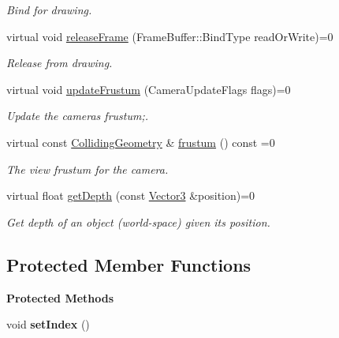\begin{Indent}
\begin{DoxyCompactItemize}
\begin{DoxyCompactList}\small\item\em Bind for drawing. \end{DoxyCompactList}\item 
\mbox{\label{classrev_1_1_abstract_camera_a5e71dd0fd2d2dbf51086f2a29d02aad7}} 
virtual void \mbox{\hyperlink{classrev_1_1_abstract_camera_a5e71dd0fd2d2dbf51086f2a29d02aad7}{release\+Frame}} (Frame\+Buffer\+::\+Bind\+Type read\+Or\+Write)=0
\begin{DoxyCompactList}\small\item\em Release from drawing. \end{DoxyCompactList}\item 
\mbox{\label{classrev_1_1_abstract_camera_a5c9b52f6030262bd0d90e62105798f5e}} 
virtual void \mbox{\hyperlink{classrev_1_1_abstract_camera_a5c9b52f6030262bd0d90e62105798f5e}{update\+Frustum}} (Camera\+Update\+Flags flags)=0
\begin{DoxyCompactList}\small\item\em Update the camera\textquotesingle{}s frustum;. \end{DoxyCompactList}\item 
virtual const \mbox{\hyperlink{classrev_1_1_colliding_geometry}{Colliding\+Geometry}} \& \mbox{\hyperlink{classrev_1_1_abstract_camera_a3bc8bb701690f7e67404a78cfb360708}{frustum}} () const =0
\begin{DoxyCompactList}\small\item\em The view frustum for the camera. \end{DoxyCompactList}\item 
virtual float \mbox{\hyperlink{classrev_1_1_abstract_camera_aad3a00ed805121a7915574b4125a343f}{get\+Depth}} (const \mbox{\hyperlink{classrev_1_1_vector}{Vector3}} \&position)=0
\begin{DoxyCompactList}\small\item\em Get depth of an object (world-\/space) given its position. \end{DoxyCompactList}\end{DoxyCompactItemize}
\end{Indent}
\subsection*{Protected Member Functions}
\begin{Indent}\textbf{ Protected Methods}\par
\begin{DoxyCompactItemize}
\item 
\mbox{\label{classrev_1_1_abstract_camera_a187f22c1339a7c14542f6f9b8d3554ef}} 
void {\bfseries set\+Index} ()
\end{DoxyCompactItemize}
\end{Indent}
